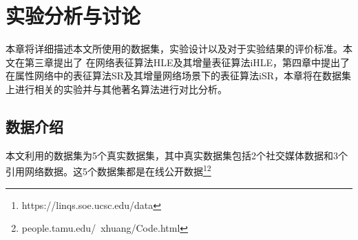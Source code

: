 \chapter{实验分析与讨论}
本章将详细描述本文所使用的数据集，实验设计以及对于实验结果的评价标准。本文在第三章提出了
在网络表征算法HLE及其增量表征算法iHLE，第四章中提出了在属性网络中的表征算法SR及其增量网络场景下的表征算法iSR，本章将在数据集上进行相关的实验并与其他著名算法进行对比分析。

\section{数据介绍}
本文利用的数据集为5个真实数据集，其中真实数据集包括2个社交媒体数据和3个引用网络数据。这5个数据集都是在线公开数据\footnote{https://linqs.soe.ucsc.edu/data}\footnote{people.tamu.edu/~xhuang/Code.html}
